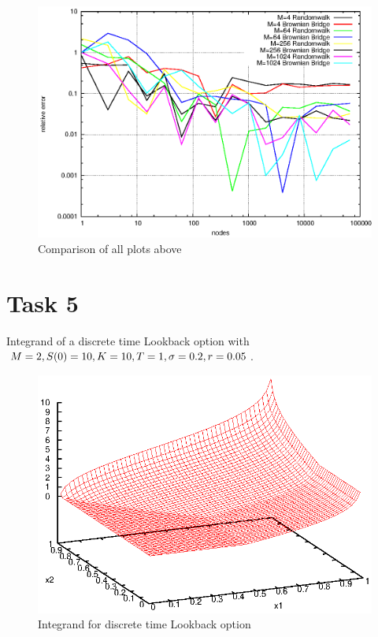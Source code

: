 \documentclass[]{article}
\begin{document}
\begin{figure}[!ht]
\centering
\includegraphics[width=.9\textwidth]{task4_mc.eps}
\caption{Comparison of all plots above}
\label{fig:Task4e}
\end{figure}
\clearpage

\section*{Task 5}
Integrand of a discrete time Lookback option with $M=2,S(0)=10,K=10,\\T=1,\sigma=0.2,r=0.05$.
\begin{figure}[!ht]
\centering
\includegraphics[width=.9\textwidth]{task5.eps}
\caption{Integrand for discrete time Lookback option}
\label{fig:Task5}
\end{figure}
\clearpage
\end{document}
